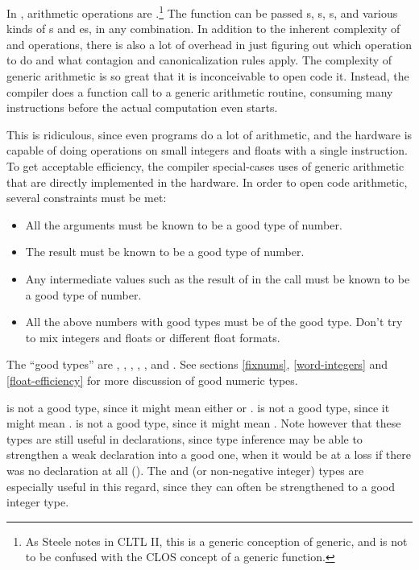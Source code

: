 In \clisp, arithmetic operations are .\footnote{As Steele
  notes in CLTL II, this is a generic conception of generic, and is
  not to be confused with the CLOS concept of a generic function.}
The \code{+} function can be passed s, s,
s, and various kinds of s and
es, in any combination.  In addition to the inherent
complexity of  and  operations, there is also
a lot of overhead in just figuring out which operation to do and what
contagion and canonicalization rules apply.  The complexity of generic
arithmetic is so great that it is inconceivable to open code it.
Instead, the compiler does a function call to a generic arithmetic
routine, consuming many instructions before the actual computation
even starts.

This is ridiculous, since even \llisp{} programs do a lot of
arithmetic, and the hardware is capable of doing operations on small
integers and floats with a single instruction.  To get acceptable
efficiency, the compiler special-cases uses of generic arithmetic that
are directly implemented in the hardware.  In order to open code
arithmetic, several constraints must be met:
\begin{itemize}
  
\item All the arguments must be known to be a good type of number.
  
\item The result must be known to be a good type of number.
  
\item Any intermediate values such as the result of 
  in the call  must be known to be a good type of
  number.
  
\item All the above numbers with good types must be of the 
  good type.  Don't try to mix integers and floats or different float
  formats.
\end{itemize}

The ``good types'' are ,
, ,
, , and .  See sections \ref{fixnums}, \ref{word-integers}
and \ref{float-efficiency} for more discussion of good numeric types.

 is not a good type, since it might mean either
 or .   is not a
good type, since it might mean .   is not
a good type, since it might mean .  Note however that
these types are still useful in declarations, since type inference may
be able to strengthen a weak declaration into a good one, when it
would be at a loss if there was no declaration at all
().  The  and
 (or non-negative integer) types are especially
useful in this regard, since they can often be strengthened to a good
integer type.

